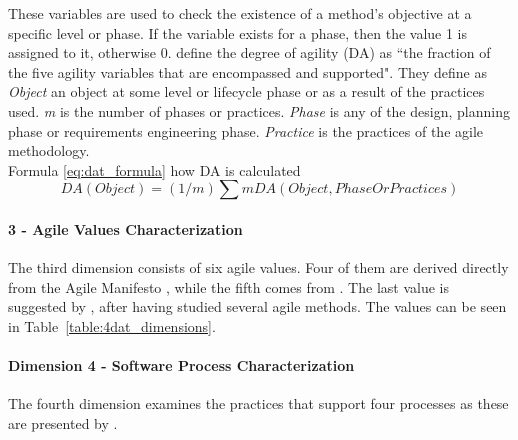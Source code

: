 These variables are used to check the existence of a method's objective at a specific level or phase. If the variable exists for a phase, then the value 1 is assigned to it, otherwise 0. \citet{qumer2006measuring} define the degree of agility (DA) as ``the fraction of the five agility variables that are encompassed and supported". They define as \textit{Object} an object at some level or lifecycle phase or as a result of the practices used. \textit{m} is the number of phases or  practices. \textit{Phase} is any of the design, planning phase or requirements engineering phase. \textit{Practice} is the practices of the agile methodology. \\ %

Formula \eqref{eq:dat_formula} how DA is calculated\\
\begin{equation} \label{eq:dat_formula} DA (Object) = (1/m) \sum m DA(Object, Phase Or Practices) \end{equation}


\paragraph{3 - Agile Values Characterization}
The third dimension consists of six agile values. Four of them are derived directly from the Agile Manifesto \cite{beck2001agile}, while the fifth comes from \citet{koch2005agile}. The last value is suggested by \citet{qumer2006measuring}, after having studied several agile methods. The values can be seen in Table~\ref{table:4dat_dimensions}.


\paragraph{Dimension 4 - Software Process Characterization}
The fourth dimension examines the practices that support four processes as these are presented by \citet{qumer2006measuring}. %

